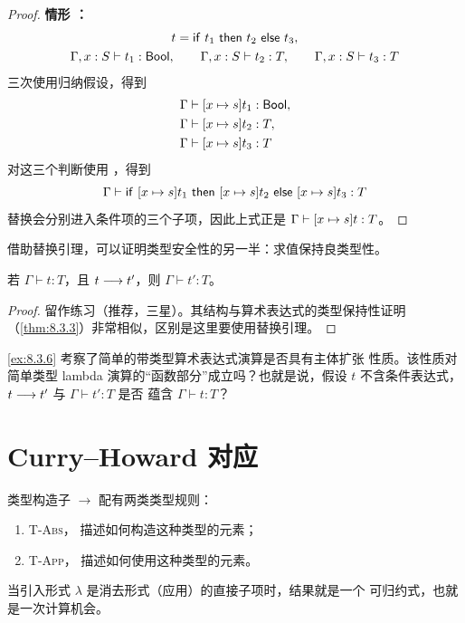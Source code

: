 \begin{proof}
\medskip\noindent
\textbf{情形 ：}
\[
\begin{gathered}
t=\mathsf{if}\ t_1\ \mathsf{then}\ t_2\ \mathsf{else}\ t_3,\\
\Gamma,x:S\vdash t_1:\mathsf{Bool},\qquad
\Gamma,x:S\vdash t_2:T,\qquad
\Gamma,x:S\vdash t_3:T
\end{gathered}
\]
三次使用归纳假设，得到
\[
\begin{aligned}
\Gamma&\vdash[x\mapsto s]t_1:\mathsf{Bool},\\
\Gamma&\vdash[x\mapsto s]t_2:T,\\
\Gamma&\vdash[x\mapsto s]t_3:T
\end{aligned}
\]
对这三个判断使用 ，得到
\[
\Gamma\vdash
\mathsf{if}\ [x\mapsto s]t_1\ \mathsf{then}\ [x\mapsto s]t_2\ \mathsf{else}\ [x\mapsto s]t_3:T
\]
替换会分别进入条件项的三个子项，因此上式正是
\(\Gamma\vdash[x\mapsto s]t:T\)。
\end{proof}

借助替换引理，可以证明类型安全性的另一半：求值保持良类型性。

\begin{theorem}[保持性]
\label{thm:9.3.9}
若 \(\Gamma\vdash t:T\)，且 \(t\mathrel{\longrightarrow} t'\)，则
\(\Gamma\vdash t':T\)。
\end{theorem}

\begin{proof}
留作练习（推荐，三星）。其结构与算术表达式的类型保持性证明
（\cref{thm:8.3.3}）非常相似，区别是这里要使用替换引理。
\end{proof}

\begin{exercise}
\label{ex:9.3.10}
\cref{ex:8.3.6} 考察了简单的带类型算术表达式演算是否具有主体扩张
性质。该性质对简单类型 lambda 演算的“函数部分”成立吗？也就是说，假设
\(t\) 不含条件表达式，\(t\mathrel{\longrightarrow} t'\) 与 \(\Gamma\vdash t':T\) 是否
蕴含 \(\Gamma\vdash t:T\)？
\end{exercise}

\section{Curry--Howard 对应}
\label{sec:9.4}

类型构造子 \(\to\) 配有两类类型规则：
\begin{enumerate}
  \item {} \textsc{T-Abs}，
    描述如何构造这种类型的元素；
  \item {} \textsc{T-App}，
    描述如何使用这种类型的元素。
\end{enumerate}
当引入形式 \(\lambda\) 是消去形式（应用）的直接子项时，结果就是一个
可归约式，也就是一次计算机会。

